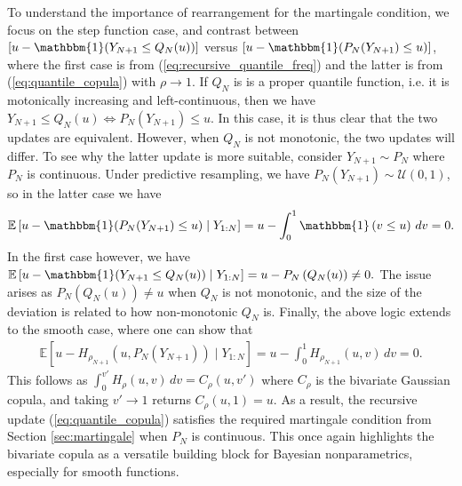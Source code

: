 \documentclass[11pt,a4paper]{article}
\newcommand{\E}{\mathbb{E}}
\begin{document}
To understand the importance of rearrangement for the martingale condition, we focus on the step function case, and contrast between $\left[u - \mathbbm{1}(Y_{N+1} \leq Q_{N}(u))\right]$ versus $[u - \mathbbm{1}(P_N(Y_{N+1}) \leq u)]$, where the first case is from (\ref{eq:recursive_quantile_freq}) and the latter is from (\ref{eq:quantile_copula}) with $\rho \to 1$. If $Q_N$ is is a proper quantile function, i.e. it is motonically increasing and left-continuous, then we have $Y_{N+1} \leq Q_N(u) \Leftrightarrow P_N(Y_{N+1}) \leq u$. In this case, it is thus clear that the two updates are equivalent. However, when $Q_N$ is not monotonic, the two updates will differ. To see why the latter update is more suitable, consider $Y_{N+1} \sim P_N$ where $P_N$ is continuous. Under predictive resampling, we have $P_N(Y_{N+1}) \sim \mathcal{U}(0,1)$, so in the latter case we have
\begin{align*}
    \E\left[u - \mathbbm{1}(P_N(Y_{N+1}) \leq u) \mid Y_{1:N}\right] = u - \int_0^1 \mathbbm{1}\left(v \leq u\right)\, dv = 0.
\end{align*}
In the first case however, we have
$\E\left[u - \mathbbm{1}(Y_{N+1} \leq Q_{N}(u)) \mid Y_{1:N}\right]  = u - P_N\left(Q_N(u)\right) \neq 0.$
The issue arises as $P_N\left(Q_N(u)\right)\neq u$ when $Q_N$ is not monotonic, and the size of the deviation is related to how non-monotonic $Q_N$ is. Finally, the above logic extends to the smooth case, where one can show that
\begin{align*}
    \E\left[u - H_{\rho_{N+1}}(u,P_N(Y_{N+1})) \mid Y_{1:N}\right] = u - \int_0^1 H_{\rho_{N+1}}(u,v)\, dv = 0.
\end{align*}
This follows as $\int_0^{v'} H_\rho(u,v) \, dv = C_\rho(u,v')$ where $C_\rho$ is the bivariate Gaussian copula, and taking $v' \to 1$ returns $C_\rho(u,1) = u$. As a result, the recursive update (\ref{eq:quantile_copula}) satisfies the required martingale condition from Section \ref{sec:martingale} when $P_N$ is continuous. This once again highlights the bivariate copula as a versatile building block for Bayesian nonparametrics, especially for smooth functions. 
\end{document}
